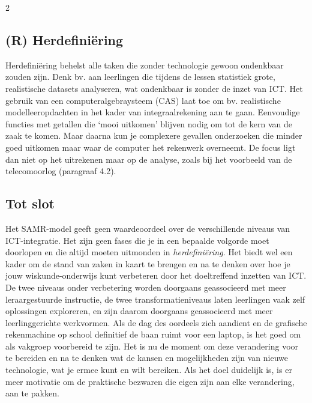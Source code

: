 \begin{multicols}{2}
\subsection*{(R) Herdefiniëring}
Herdefiniëring behelst alle taken die zonder technologie gewoon ondenkbaar zouden zijn. Denk bv. aan leerlingen die tijdens de lessen statistiek grote, realistische datasets analyseren, wat ondenkbaar is zonder de inzet van ICT. Het gebruik van een computeralgebraysteem (CAS) laat toe om bv. realistische modelleeropdachten in het kader van integraalrekening aan te gaan. Eenvoudige functies met getallen die `mooi uitkomen' blijven nodig om tot de kern van de zaak te komen. Maar daarna kun je complexere gevallen onderzoeken die minder goed uitkomen maar waar de computer het rekenwerk overneemt. De focus ligt dan niet op het uitrekenen maar op de analyse, zoals bij het voorbeeld van de telecomoorlog (paragraaf 4.2). 

\subsection*{Tot slot}
Het SAMR-model geeft geen waardeoordeel over de verschillende niveaus van ICT-integratie. Het zijn geen fases die je in een bepaalde volgorde moet doorlopen en die altijd moeten uitmonden in \textit{herdefiniëring}. Het biedt wel een kader om de stand van zaken in kaart te brengen en na te denken over hoe je jouw wiskunde-onderwijs kunt verbeteren door het doeltreffend inzetten van ICT. De twee niveaus onder verbetering worden doorgaans geassocieerd met meer leraargestuurde instructie, de twee transformatieniveaus laten leerlingen vaak zelf oplossingen exploreren, en zijn daarom doorgaans geassocieerd met meer leerlinggerichte werkvormen. Als de dag des oordeels zich aandient en de grafische rekenmachine op school definitief de baan ruimt voor een laptop, is het goed om als vakgroep voorbereid te zijn. Het is nu de moment om deze verandering voor te bereiden en na te denken wat de kansen en mogelijkheden zijn van nieuwe technologie, wat je ermee kunt en wilt bereiken. Als het doel duidelijk is, is er meer motivatie om de praktische bezwaren die eigen zijn aan elke verandering, aan te pakken.



\end{multicols}
